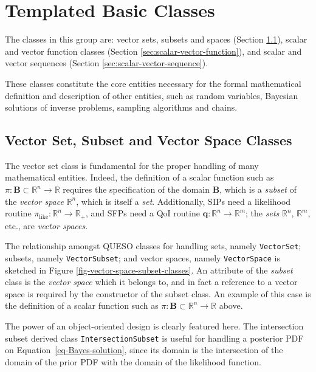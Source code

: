 \section{Templated Basic Classes}
The classes in this group are: vector sets, subsets and spaces (Section \ref{sec:vector-set-space}), scalar and vector function classes (Section \ref{sec:scalar-vector-function}), and scalar and vector sequences (Section \ref{sec:scalar-vector-sequence}).

These classes constitute the core entities necessary for the formal
mathematical definition and description of other entities, such as
random variables, Bayesian solutions of inverse problems, sampling algorithms and chains.



\subsection{Vector Set, Subset  and Vector Space Classes}\label{sec:vector-set-space}
%
The vector set class is fundamental for the proper handling of many mathematical entities.
Indeed, the definition of a scalar function such as $\pi:\mathbf{B}\subset\mathbb{R}^n\rightarrow\mathbb{R}$ requires the
specification of the domain $\mathbf{B}$, which is a {\it subset} of the {\it vector space} $\mathbb{R}^n$, which is itself a {\it set}. Additionally, 
 SIPs need a likelihood routine $\pi_{\text{like}}:\mathbb{R}^n\rightarrow\mathbb{R}_+$,
and SFPs need a QoI routine $\mathbf{q}:\mathbb{R}^n\rightarrow\mathbb{R}^m$; the \textit{sets} $\mathbb{R}^n$, $\mathbb{R}^m$, etc., are {\it vector spaces}.


The relationship amongst QUESO classes for handling sets, namely \verb+VectorSet+; subsets, namely \verb+VectorSubset+;  and vector spaces, namely \verb+VectorSpace+ is sketched in Figure \ref{fig-vector-space-subset-classes}.
%
An attribute of the {\it subset} class is the {\it vector space} which it belongs to, and in fact a reference to a vector space is required by the constructor of the subset class. An example of this case is the definition of a scalar function such as $\pi:\mathbf{B}\subset\mathbb{R}^n\rightarrow\mathbb{R}$ above. %

The power of an object-oriented design is clearly featured here.
The intersection subset derived class \verb+IntersectionSubset+ is useful for handling a posterior PDF  on Equation~\eqref{eq-Bayes-solution},
since its domain is the intersection of the domain of the prior PDF with the domain of the likelihood function.

